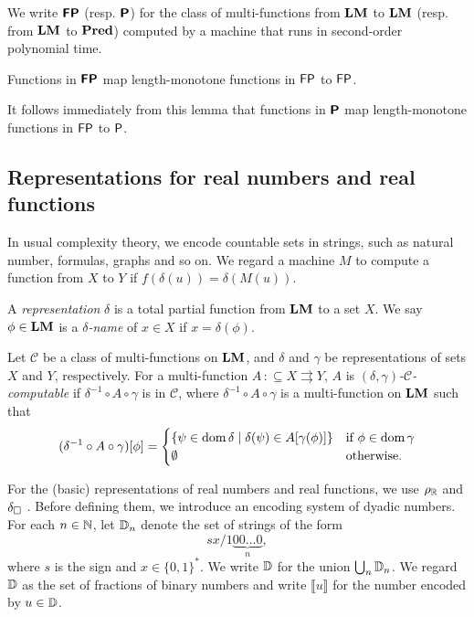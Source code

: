 \documentclass[envcountsame,orivec,oribibl]{llncs}
\newcommand{\pcolon}{\mathpunct{\,:\subseteq}}
\begin{document}
\begin{definition}
 We write $\text{\bfseries \sffamily \upshape FP}$ (resp. $\text{\bfseries \sffamily \upshape P}$) for the class of
 multi-functions from $\mathbf{LM}$ to $\mathbf{LM}$ (resp. from $\mathbf{LM}$ to $\mathbf{Pred}$) 
 computed by a machine that runs
 in second-order polynomial time.
\end{definition}

\begin{lemma}
 Functions in $\text{\bfseries \sffamily \upshape FP}$ map 
 length-monotone functions in $\mathsf{FP}$ to $\mathsf{FP}$.
\end{lemma}

It follows immediately from this lemma that functions in $\text{\bfseries \sffamily \upshape P}$ map 
 length-monotone functions in $\mathsf{FP}$ to $\mathsf{P}$.


\subsection{Representations for real numbers and real functions}


In usual complexity theory, we encode countable sets in strings, such as
natural number, formulas, graphs and so on.
We regard a machine $M$ to compute a function from $X$ to $Y$ if
$f(\delta(u)) = \delta(M(u))$.

A {\em representation} $\delta$ is a total partial function from $\mathbf{LM}$ to a set $X$.
We say $\phi \in \mathbf{LM}$ is a {\em $\delta$-name} of $x \in X$
if $x = \delta(\phi)$.

Let $\mathcal C$ be a class of multi-functions on $\mathbf{LM}$,
and $\delta$ and $\gamma$ be representations of sets $X$ and $Y$, respectively.
For a multi-function $A \pcolon X \rightrightarrows Y$,
$A$ is {\em $(\delta, \gamma)$-$\mathcal C$-computable} if 
$\delta^{-1} \circ A \circ \gamma$ is in $\mathcal C$,
where  $\delta^{-1} \circ A \circ \gamma$ is a multi-function on $\mathbf{LM}$
such that
\begin{equation}
 (\delta^{-1} \circ A \circ \gamma)[\phi] = 
  \begin{cases}
   \{\psi \in \mathop{\rm dom} \delta \mid \delta(\psi) \in A[\gamma(\phi)] \}
   & 
   \text{if } \phi \in \mathop{\rm dom} \gamma 
   \\ 
   \emptyset 
   &
   \text{otherwise.}
  \end{cases}
\end{equation}


For the (basic) representations of real numbers and real functions,
we use $\rho _\mathbb R$ and $\delta _\square$ \cite{kawamura2012complexity}.
Before defining them, we introduce an encoding system of dyadic numbers.
For each $n \in \mathbb N$, let $\mathbb D_n$ denote the set of strings of the form
\begin{equation}
 sx/1\!\underbrace{00\dots0}_{n},
\end{equation}
where $s$ is the sign and $x \in \{0,1\}^*$.
We write $\mathbb D$ for the union $\bigcup _n \mathbb D _n$.
We regard $\mathbb D$ as the set of fractions of binary numbers
and write $\llbracket u \rrbracket$ for the number encoded by $u \in \mathbb D$.
\end{document}
